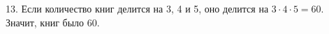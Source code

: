 13. Если количество книг делится на 3, 4 и 5, оно делится на $3\cdot4\cdot5=60.$ Значит, книг было 60.\\
